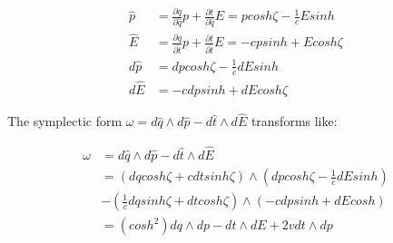 \documentclass[aps,pra,10pt,twocolumn,floatfix,nofootinbib]{revtex4-1}
\theoremstyle{definition}
\begin{document}
\begin{align*}
\hat{p} &= \frac{\partial q}{\partial \hat{q}} p + \frac{\partial t}{\partial \hat{q}} E = p cosh \zeta - \frac{1}{c} E sinh \\
\hat{E} &= \frac{\partial q}{\partial \hat{t}} p + \frac{\partial t}{\partial \hat{t}} E = - c p sinh + E cosh \zeta \\
d \hat{p} &= dp cosh \zeta - \frac{1}{c} dE sinh \\
d \hat{E} &= - c dp sinh + dE cosh \zeta
\end{align*}

The symplectic form $\omega = d\hat{q} \wedge d\hat{p} - d\hat{t} \wedge d\hat{E}$ transforms like:

\begin{align*}
\omega &= d\hat{q} \wedge d\hat{p} - d\hat{t} \wedge d\hat{E} \\
&= (dq cosh \zeta  + cdt sinh \zeta) \wedge (dp cosh \zeta - \frac{1}{c} dE sinh) \\
&- (\frac{1}{c} dq sinh \zeta + dt cosh \zeta) \wedge (- c dp sinh + dE cosh)\\
&= (cosh^2 ) dq \wedge dp - dt \wedge dE + 2v dt \wedge dp
\end{align*}
\end{document}
